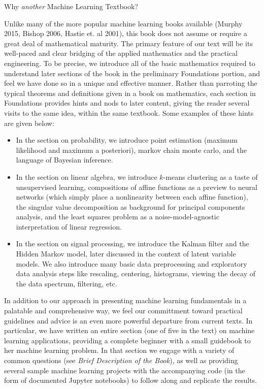 \documentclass[10pt]{article}
\newenvironment{changemargin}[2]{%
\begin{list}{}{%
\setlength{\topsep}{0pt}%
\setlength{\leftmargin}{#1}%
\setlength{\rightmargin}{#2}%
\setlength{\listparindent}{\parindent}%
\setlength{\itemindent}{\parindent}%
\setlength{\parsep}{\parskip}%
}%
\item[]}{\end{list}}
\renewcommand{\it}{\textit}
\begin{document}
\begin{changemargin}{+-1cm}{-3cm}
\vspace{1cm}
\noindent
\large{Why \it{another} Machine Learning Textbook?}\\
\small

Unlike many of the more popular machine learning books available (Murphy 2015, Bishop 2006, Hastie et. al 2001), this book does not assume or require a great deal of mathematical maturity. The primary feature of our text will be its well-paced and clear bridging of the applied mathematics and the practical engineering. To be precise, we introduce all of the basic mathematics required to understand later sections of the book in the preliminary Foundations portion, and feel we have done so in a unique and effective manner. Rather than parroting the typical theorems and definitions given in a book on mathematics, each section in Foundations provides hints and nods to later content, giving the reader several visits to the same idea, within the same textbook. Some examples of these hints are given below:

\begin{itemize}
  \item In the section on probability, we introduce point estimation (maximum likelihood and maximum a posteriori), markov chain monte carlo, and the language of Bayesian inference.
  \item In the section on linear algebra, we introduce $k$-means clustering as a taste of unsupervised learning, compositions of affine functions as a preview to neural networks (which simply place a nonlinearity between each affine function), the singular value decomposition as background for principal components analysis, and the least squares problem as a noise-model-agnostic interpretation of linear regression.
  \item In the section on signal processing, we introduce the Kalman filter and the Hidden Markov model, later discussed in the context of latent variable models. We also introduce many basic data preprocessing and exploratory data analysis steps like rescaling, centering, histograms, viewing the decay of the data spectrum, filtering, etc.
\end{itemize}

In addition to our approach in presenting machine learning fundamentals in a palatable and comprehensive way, we feel our committment toward practical guidelines and advice is an even more powerful departure from current texts. In particular, we have written an entire section (one of five in the text) on machine learning applications, providing a complete beginner with a small guidebook to her machine learning problem. In that section we engage with a variety of common questions (see \it{Brief Description of the Book}), as well as providing several sample machine learning projects with the accompanying code (in the form of documented Jupyter notebooks) to follow along and replicate the results. \\


\end{changemargin}
\end{document}
